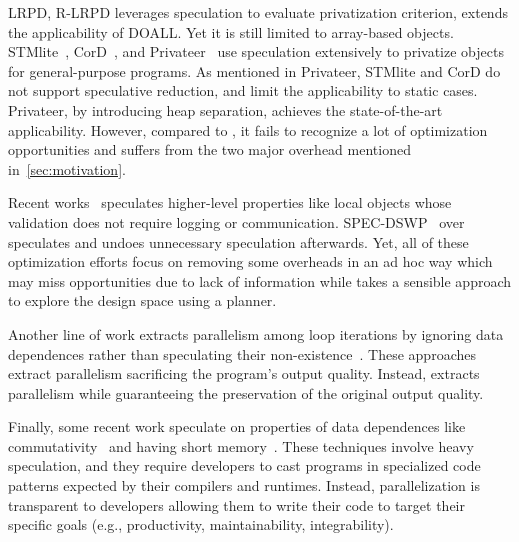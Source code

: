 LRPD\cite{rauchwerger:99:pds}, R-LRPD\cite{dang:02:ipdps} leverages
speculation to evaluate privatization criterion, extends the applicability
of DOALL. Yet it is still limited to array-based objects.
STMlite~\cite{mehrara:09:stmlite}, CorD~\cite{tian:10:pldi}, and
Privateer~\cite{johnson:12:pldi} use speculation extensively to privatize
objects for general-purpose programs. As mentioned in Privateer, STMlite
and CorD do not support speculative reduction, and limit the applicability
to static cases. Privateer, by introducing heap separation, achieves the
state-of-the-art applicability. However, compared to \namensp, it fails to
recognize a lot of optimization opportunities and suffers from the two
major overhead mentioned in~\cref{sec:motivation}.

Recent works~\cite{ctian:2008:micro,johnson:12:pldi,kim:12:cgo} speculates
higher-level properties like local objects whose validation does not
require logging or communication. SPEC-DSWP~\cite{vachharajani:07:pact}
over speculates and undoes unnecessary speculation afterwards. Yet, all of
these optimization efforts focus on removing some overheads in an ad hoc
way which may miss opportunities due to lack of information while
\name takes a sensible approach to explore the design space using a
planner.

Another line of work extracts parallelism among loop iterations by ignoring
data dependences rather than speculating their
non-existence~\cite{campanoni:2015:cgo,Udupa:2011:AEB:1993498.1993555,misailovic2013parallelizing}.
These approaches extract parallelism sacrificing the program's output
quality. Instead, \name extracts parallelism while guaranteeing the
preservation of the original output quality.

Finally, some recent work speculate on properties of data dependences like
commutativity~\cite{kulkarni:07:pldi,Nguyen:2014:DGO:2541940.2541964} and
having short memory~\cite{Deiana:2018:UPN:3173162.3173181}. These
techniques involve heavy speculation, and they require developers to cast
programs in specialized code patterns expected by their compilers and
runtimes. Instead, \name parallelization is transparent to developers
allowing them to write their code to target their specific goals (e.g.,
productivity, maintainability, integrability).




